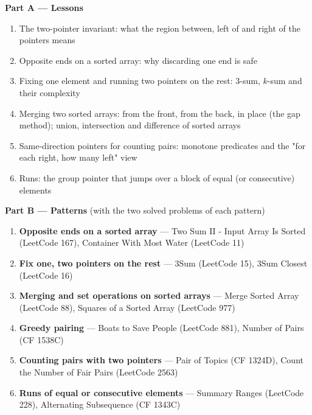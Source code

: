 \begin{plannedbox}
\textbf{Part A --- Lessons}
\begin{enumerate}[leftmargin=*, label=\textbf{A\arabic*.}, itemsep=1pt]
    \item The two-pointer invariant: what the region between, left of and right of the pointers means
    \item Opposite ends on a sorted array: why discarding one end is safe
    \item Fixing one element and running two pointers on the rest: 3-sum, $k$-sum and their complexity
    \item Merging two sorted arrays: from the front, from the back, in place (the gap method); union, intersection and difference of sorted arrays
    \item Same-direction pointers for counting pairs: monotone predicates and the "for each right, how many left" view
    \item Runs: the group pointer that jumps over a block of equal (or consecutive) elements
\end{enumerate}
\textbf{Part B --- Patterns} (with the two solved problems of each pattern)
\begin{enumerate}[leftmargin=*, label=\textbf{P\arabic*.}, itemsep=1pt]
    \item \textbf{Opposite ends on a sorted array} --- Two Sum II - Input Array Is Sorted {\small\color{darkgray}(LeetCode 167)}, Container With Most Water {\small\color{darkgray}(LeetCode 11)}
    \item \textbf{Fix one, two pointers on the rest} --- 3Sum {\small\color{darkgray}(LeetCode 15)}, 3Sum Closest {\small\color{darkgray}(LeetCode 16)}
    \item \textbf{Merging and set operations on sorted arrays} --- Merge Sorted Array {\small\color{darkgray}(LeetCode 88)}, Squares of a Sorted Array {\small\color{darkgray}(LeetCode 977)}
    \item \textbf{Greedy pairing} --- Boats to Save People {\small\color{darkgray}(LeetCode 881)}, Number of Pairs {\small\color{darkgray}(CF 1538C)}
    \item \textbf{Counting pairs with two pointers} --- Pair of Topics {\small\color{darkgray}(CF 1324D)}, Count the Number of Fair Pairs {\small\color{darkgray}(LeetCode 2563)}
    \item \textbf{Runs of equal or consecutive elements} --- Summary Ranges {\small\color{darkgray}(LeetCode 228)}, Alternating Subsequence {\small\color{darkgray}(CF 1343C)}
\end{enumerate}
\end{plannedbox}
